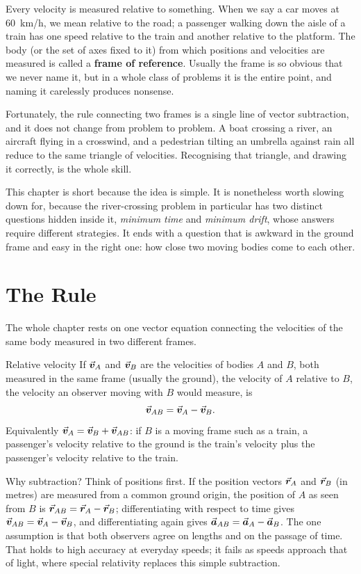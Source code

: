 
Every velocity is measured relative to something. When we say a car moves at \SI{60}{km/h}, we mean
relative to the road; a passenger walking down the aisle of a train has one speed relative to the train
and another relative to the platform. The body (or the set of axes fixed to it) from which positions and
velocities are measured is called a \textbf{frame of reference}. Usually the frame is so obvious that we
never name it, but in a whole class of problems it is the entire point, and naming it carelessly
produces nonsense.

Fortunately, the rule connecting two frames is a single line of vector subtraction, and it does not
change from problem to problem. A boat crossing a river, an aircraft flying in a crosswind, and a
pedestrian tilting an umbrella against rain all reduce to the same triangle of velocities. Recognising
that triangle, and drawing it correctly, is the whole skill.

This chapter is short because the idea is simple. It is nonetheless worth slowing down for, because the
river-crossing problem in particular has two distinct questions hidden inside it, \emph{minimum time} and
\emph{minimum drift}, whose answers require different strategies. It ends with a question that is
awkward in the ground frame and easy in the right one: how close two moving bodies come to each other.

\section{The Rule}\label{sec:rule}

The whole chapter rests on one vector equation connecting the velocities of the same body measured in two
different frames.

\begin{defbox}{Relative velocity}
If $\vec{\bm{v}}_A$ and $\vec{\bm{v}}_B$ are the velocities of bodies $A$ and $B$, both measured in the same frame (usually
the ground), the velocity of $A$ relative to $B$, the velocity an observer moving with $B$ would measure, is
\[
\vec{\bm{v}}_{AB}=\vec{\bm{v}}_A-\vec{\bm{v}}_B.
\]
Equivalently $\vec{\bm{v}}_A=\vec{\bm{v}}_B+\vec{\bm{v}}_{AB}$: if $B$ is a moving frame such as a train, a passenger's velocity
relative to the ground is the train's velocity plus the passenger's velocity relative to the train.
\end{defbox}

Why subtraction? Think of positions first. If the position vectors $\vec{\bm{r}}_A$ and $\vec{\bm{r}}_B$ (in metres) are measured from a common ground origin, the
position of $A$ as seen from $B$ is $\vec{\bm{r}}_{AB}=\vec{\bm{r}}_A-\vec{\bm{r}}_B$; differentiating with respect to time gives
$\vec{\bm{v}}_{AB}=\vec{\bm{v}}_A-\vec{\bm{v}}_B$, and differentiating again gives $\vec{\bm{a}}_{AB}=\vec{\bm{a}}_A-\vec{\bm{a}}_B$. The one assumption is that
both observers agree on lengths and on the passage of time. That holds to high accuracy at everyday
speeds; it fails as speeds approach that of light, where special relativity replaces this simple
subtraction.

